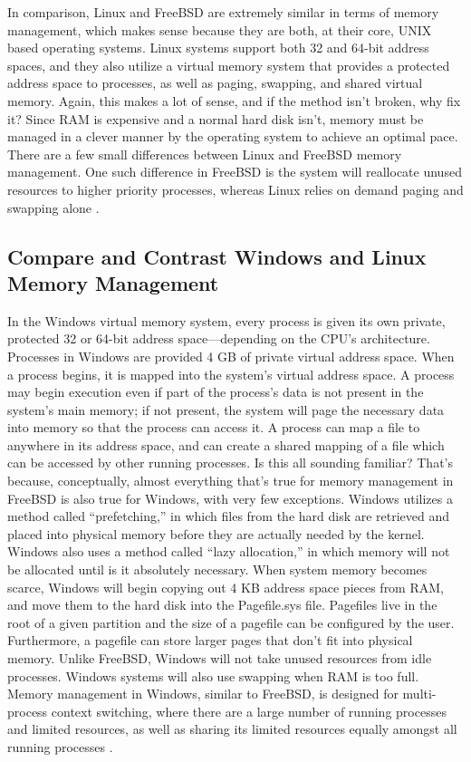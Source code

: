 \documentclass[onecolumn, draftclsnofoot,10pt, compsoc]{IEEEtran}
\begin{document}
\noindent In comparison, Linux and FreeBSD are extremely similar in terms of memory management, which makes sense because they are both, at their core, UNIX based operating systems. Linux systems support both 32 and 64-bit address spaces, and they also utilize a virtual memory system that provides a protected address space to processes, as well as paging, swapping, and shared virtual memory. Again, this makes a lot of sense, and if the method isn’t broken, why fix it? Since RAM is expensive and a normal hard disk isn’t, memory must be managed in a clever manner by the operating system to achieve an optimal pace. There are a few small differences between Linux and FreeBSD memory management. One such difference in FreeBSD is the system will reallocate unused resources to higher priority processes, whereas Linux relies on demand paging and swapping alone \cite{Linux1Mem} \cite{Linux}.\\

\subsection{Compare and Contrast Windows and Linux Memory Management}
\noindent In the Windows virtual memory system, every process is given its own private, protected 32 or 64-bit address space–--depending on the CPU’s architecture. Processes in Windows are provided 4 GB of private virtual address space. When a process begins, it is mapped into the system’s virtual address space. A process may begin execution even if part of the process’s data is not present in the system’s main memory; if not present, the system will page the necessary data into memory so that the process can access it. A process can map a file to anywhere in its address space, and can create a shared mapping of a file which can be accessed by other running processes. Is this all sounding familiar? That’s because, conceptually, almost everything that’s true for memory management in FreeBSD is also true for Windows, with very few exceptions. Windows utilizes a method called “prefetching,” in which files from the hard disk are retrieved and placed into physical memory before they are actually needed by the kernel. Windows also uses a method called “lazy allocation,” in which memory will not be allocated until is it absolutely necessary. When system memory becomes scarce, Windows will begin copying out 4 KB address space pieces from RAM, and move them to the hard disk into the Pagefile.sys file. Pagefiles live in the root of a given partition and the size of a pagefile can be configured by the user. Furthermore, a pagefile can store larger pages that don’t fit into physical memory. Unlike FreeBSD, Windows will not take unused resources from idle processes. Windows systems will also use swapping when RAM is too full. Memory management in Windows, similar to FreeBSD, is designed for multi-process context switching, where there are a large number of running processes and limited resources, as well as sharing its limited resources equally amongst all running processes \cite{MSWindows1Mem} \cite{MSWindows2Mem}.\\
\end{document}
